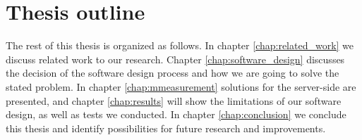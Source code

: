 \section{Thesis outline}
\label{sec:intro:outline}

The rest of this thesis is organized as follows. In chapter \ref{chap:related_work} we discuss related work to our research. Chapter \ref{chap:software_design} discusses the decision of the software design process and how we are going to solve the stated problem. In chapter \ref{chap:mmeasurement} solutions for the server-side are presented, and chapter \ref{chap:results} will show the limitations of our software design, as well as tests we conducted. In chapter \ref{chap:conclusion} we conclude this thesis and identify possibilities for future research and improvements.

